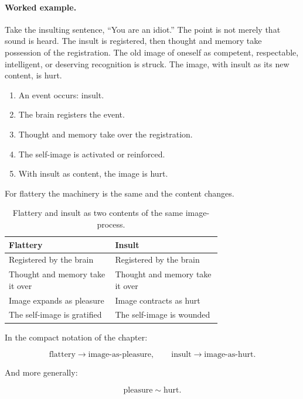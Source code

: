 \paragraph{Worked example.}
Take the insulting sentence, ``You are an idiot.'' The point is not merely that sound is heard. The insult is registered, then thought and memory take possession of the registration. The old image of oneself as competent, respectable, intelligent, or deserving recognition is struck. The image, with insult as its new content, is hurt.

\begin{enumerate}
\item An event occurs: insult.
\item The brain registers the event.
\item Thought and memory take over the registration.
\item The self-image is activated or reinforced.
\item With insult as content, the image is hurt.
\end{enumerate}

For flattery the machinery is the same and the content changes.

\begin{table}
\centering
\begin{tabular}{|p{0.36\linewidth}|p{0.36\linewidth}|}
\hline
\textbf{Flattery} & \textbf{Insult} \\
\hline
Registered by the brain & Registered by the brain \\
\hline
Thought and memory take it over & Thought and memory take it over \\
\hline
Image expands as pleasure & Image contracts as hurt \\
\hline
The self-image is gratified & The self-image is wounded \\
\hline
\end{tabular}
\caption{Flattery and insult as two contents of the same image-process.}
\end{table}

In the compact notation of the chapter:

\begin{equation}
\text{flattery} \longrightarrow \text{image-as-pleasure},
\qquad
\text{insult} \longrightarrow \text{image-as-hurt}.
\end{equation}

And more generally:

\begin{equation}
\text{pleasure} \sim \text{hurt}.
\end{equation}

